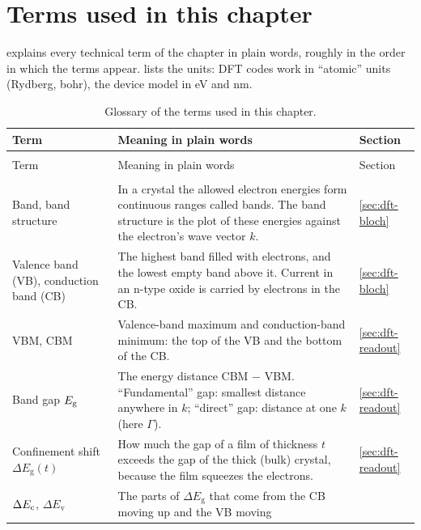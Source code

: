 \section{Terms used in this chapter}
\label{sec:dft-glossary}

 explains every technical term of the chapter in plain words, roughly in the order in which the
terms appear.  lists the units: DFT codes work in ``atomic'' units (Rydberg, bohr), the device
model in eV and nm.

\begin{small}
\begin{longtable}{@{}>{\raggedright\arraybackslash}p{3.3cm}>{\raggedright\arraybackslash}p{9.0cm}>{\raggedright\arraybackslash}p{1.6cm}@{}}
\caption{Glossary of the terms used in this chapter.}\label{tab:dft-glossary}\\
\toprule
Term & Meaning in plain words & Section \\
\midrule
\endfirsthead
\multicolumn{3}{@{}l}{\textit{\Cref{tab:dft-glossary}, continued}}\\
\toprule
Term & Meaning in plain words & Section \\
\midrule
\endhead
\bottomrule
\endfoot
\multicolumn{3}{@{}l}{\textit{Physics of electrons in solids}}\\
Band, band structure & In a crystal the allowed electron energies form continuous ranges called bands. The band
structure is the plot of these energies against the electron's wave vector $k$. & \ref{sec:dft-bloch} \\
Valence band (VB), conduction band (CB) & The highest band filled with electrons, and the lowest empty band above it.
Current in an n-type oxide is carried by electrons in the CB. & \ref{sec:dft-bloch} \\
VBM, CBM & Valence-band maximum and conduction-band minimum: the top of the VB and the bottom of the CB. & \ref{sec:dft-readout} \\
Band gap $E_{\mathrm{g}}$ & The energy distance CBM $-$ VBM. ``Fundamental'' gap: smallest distance anywhere in $k$;
``direct'' gap: distance at one $k$ (here $\Gamma$). & \ref{sec:dft-readout} \\
Confinement shift $\Delta E_{\mathrm{g}}(t)$ & How much the gap of a film of thickness $t$ exceeds the gap of the thick
(bulk) crystal, because the film squeezes the electrons. & \ref{sec:dft-readout} \\
$\Delta E_{\mathrm{c}}$, $\Delta E_{\mathrm{v}}$ & The parts of $\Delta E_{\mathrm{g}}$ that come from the CB moving up and the VB moving

\end{longtable}
\end{small}
